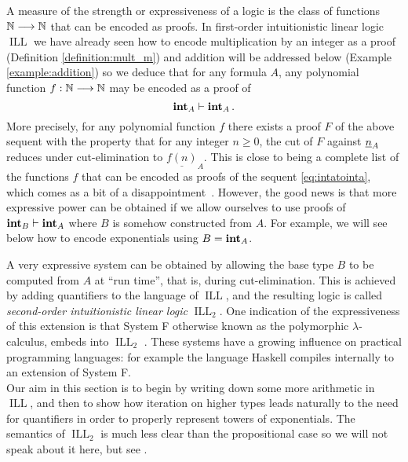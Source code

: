 \documentclass[english,letter paper,12pt,reqno]{article}
\theoremstyle{example}
\numberwithin{equation}{section}
\DeclareMathOperator{\ILL}{ILL}
\def\inta{\bold{int}}
\begin{document}
A measure of the strength or expressiveness of a logic is the class of functions $\mathbb{N} \longrightarrow \mathbb{N}$ that can be encoded as proofs. In first-order intuitionistic linear logic $\ILL$ we have already seen how to encode multiplication by an integer as a proof (Definition \ref{definition:mult_m}) and addition will be addressed below (Example \ref{example:addition}) so we deduce that for any formula $A$, any polynomial function $f: \mathbb{N} \longrightarrow \mathbb{N}$ may be encoded as a proof of
\begin{equation}\label{eq:intatointa}
\inta_A \vdash \inta_A\,.
\end{equation}
More precisely, for any polynomial function $f$ there exists a proof $F$ of the above sequent with the property that for any integer $n \ge 0$, the cut of $F$ against $\underline{n}_A$ reduces under cut-elimination to $\underline{f(n)}_A$. This is close to being a complete list of the functions $f$ that can be encoded as proofs of the sequent \eqref{eq:intatointa}, which comes as a bit of a disappointment~\cite{schwicht}. However, the good news is that more expressive power can be obtained if we allow ourselves to use proofs of $\inta_B \vdash \inta_A$ where $B$ is somehow constructed from $A$. For example, we will see below how to encode exponentials using $B = \inta_A$. 

A very expressive system can be obtained by allowing the base type $B$ to be computed from $A$ at ``run time'', that is, during cut-elimination. This is achieved by adding quantifiers to the language of $\ILL$, and the resulting logic is called \emph{second-order intuitionistic linear logic} $\ILL_2$. One indication of the expressiveness of this extension is that System F \cite[\S 11]{girard_prooftypes} otherwise known as the polymorphic $\lambda$-calculus, embeds into $\ILL_2$ \cite[\S 5.2]{girard_llogic}. These systems have a growing influence on practical programming languages: for example the language Haskell compiles internally to an extension of System F. 
\\


Our aim in this section is to begin by writing down some more arithmetic in $\ILL$, and then to show how iteration on higher types leads naturally to the need for quantifiers in order to properly represent towers of exponentials. The semantics of $\ILL_2$ is much less clear than the propositional case so we will not speak about it here, but see \cite{girard_systemf,seely_systemf, seely}.
\end{document}
